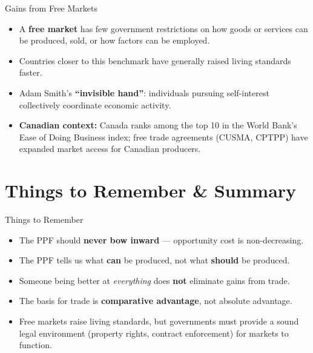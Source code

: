 \documentclass[aspectratio=169]{beamer}
\begin{document}
\begin{frame}{Gains from Free Markets}
\transfade
\begin{itemize}[<+->]
  \item A \textbf{free market} has few government restrictions on how goods or services can be produced, sold, or how factors can be employed.
  \item Countries closer to this benchmark have generally raised living standards faster.
  \item Adam Smith's \textbf{``invisible hand''}: individuals pursuing self-interest collectively coordinate economic activity.
  \item \textbf{Canadian context:} Canada ranks among the top 10 in the World Bank's Ease of Doing Business index; free trade agreements (CUSMA, CPTPP) have expanded market access for Canadian producers.
\end{itemize}
\end{frame}

\section{Things to Remember \& Summary}

\begin{frame}{Things to Remember}
\transfade
\begin{itemize}[<+->]
  \item The PPF should \textbf{never bow inward} --- opportunity cost is non-decreasing.
  \item The PPF tells us what \textbf{can} be produced, not what \textbf{should} be produced.
  \item Someone being better at \emph{everything} does \textbf{not} eliminate gains from trade.
  \item The basis for trade is \textbf{comparative advantage}, not absolute advantage.
  \item Free markets raise living standards, but governments must provide a sound legal environment (property rights, contract enforcement) for markets to function.
\end{itemize}
\end{frame}
\end{document}
